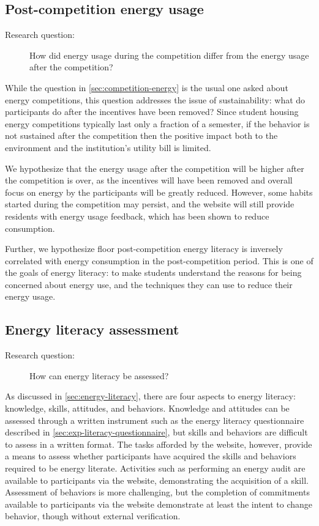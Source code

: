 \subsection{Post-competition energy usage}
\label{sec:post-competition-energy}

\begin{description}
\item[Research question:] How did energy usage during the competition differ from the energy usage after the competition?
\end{description}

While the question in \autoref{sec:competition-energy} is the usual one asked about energy competitions, this question addresses the issue of sustainability: what do participants do after the incentives have been removed? Since student housing energy competitions typically last only a fraction of a semester, if the behavior is not sustained after the competition then the positive impact both to the environment and the institution's utility bill is limited.

We hypothesize that the energy usage after the competition will be higher after the competition is over, as the incentives will have been removed and overall focus on energy by the participants will be greatly reduced. However, some habits started during the competition may persist, and the website will still provide residents with energy usage feedback, which has been shown to reduce consumption.

Further, we hypothesize floor post-competition energy literacy is inversely correlated with energy consumption in the post-competition period. This is one of the goals of energy literacy: to make students understand the reasons for being concerned about energy use, and the techniques they can use to reduce their energy usage.

\subsection{Energy literacy assessment}

\begin{description}
\item[Research question:] How can energy literacy be assessed?
\end{description}

As discussed in \autoref{sec:energy-literacy}, there are four aspects to energy literacy: knowledge, skills, attitudes, and behaviors. Knowledge and attitudes can be assessed through a written instrument such as the energy literacy questionnaire described in \autoref{sec:exp-literacy-questionnaire}, but skills and behaviors are difficult to assess in a written format. The tasks afforded by the website, however, provide a means to assess whether participants have acquired the skills and behaviors required to be energy literate. Activities such as performing an energy audit are available to participants via the website, demonstrating the acquisition of a skill. Assessment of behaviors is more challenging, but the completion of commitments available to participants via the website demonstrate at least the intent to change behavior, though without external verification.

